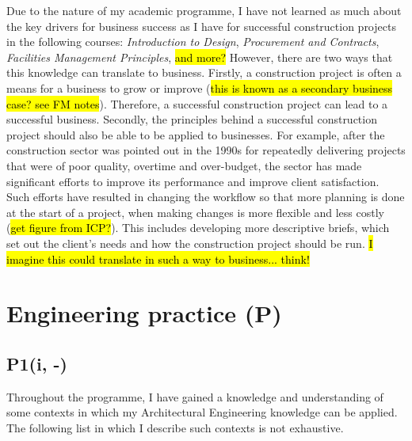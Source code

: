 Due to the nature of my academic programme, I have not learned as much about the key drivers for business success as I have for successful construction projects in the following courses:
\textit{Introduction to Design},
\textit{Procurement and Contracts},
\textit{Facilities Management Principles},
\hl{and more?}
However, there are two ways that this knowledge can translate to business.
Firstly, a construction project is often a means for a business to grow or improve (\hl{this is known as a secondary business case? see FM notes}).
Therefore, a successful construction project can lead to a successful business.
Secondly, the principles behind a successful construction project should also be able to be applied to businesses.
For example, after the construction sector was pointed out in the 1990s for repeatedly delivering projects that were of poor quality, overtime and over-budget, the sector has made significant efforts to improve its performance and improve client satisfaction.
Such efforts have resulted in changing the workflow so that more planning is done at the start of a project, when making changes is more flexible and less costly (\hl{get figure from ICP?}).
This includes developing more descriptive briefs, which set out the client's needs and how the construction project should be run.
\hl{I imagine this could translate in such a way to business... think!}



\section{Engineering practice (P)}


\subsection*{P1(i, -)}

Throughout the programme, I have gained a knowledge and understanding of some contexts in which my Architectural Engineering knowledge can be applied.
The following list in which I describe such contexts is not exhaustive.

